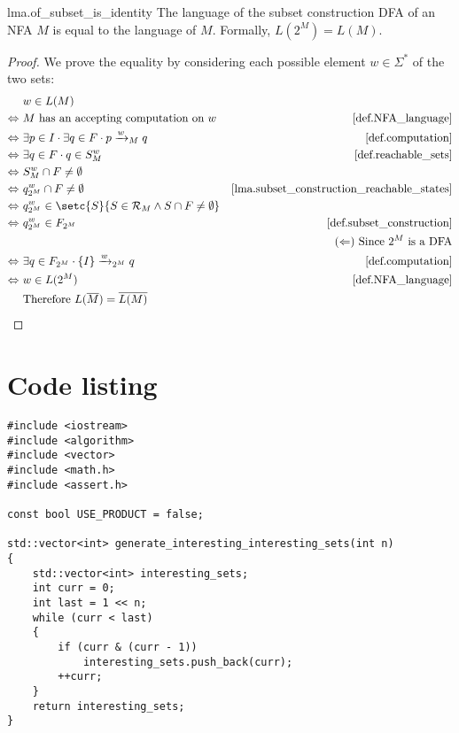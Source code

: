 \documentclass{report}
\DeclarePairedDelimiter{\set}{\{}{\}}
\theoremstyle{definition}
\begin{document}
\begin{appendices}
\begin{replemma}{lma.of_subset_is_identity}
The language of the subset construction DFA of an NFA $M$ is equal to the
language of $M$. Formally, $L(2^M) = L(M)$.
\end{replemma}

\begin{proof}
We prove the equality by considering each possible element $w \in \Sigma^{\ast}$
of the two sets:
\begin{align*}
& w \in L(M) \\
\Leftrightarrow \ & M \text{ has an accepting computation on } w
& \text{\cref{def.NFA_language}} \\
\Leftrightarrow \ & \exists p \in I \cdot \exists q \in F \cdot
p \xrightarrow{w}_M q
& \text{\cref{def.computation}} \\
\Leftrightarrow \ & \exists q \in F \cdot q \in S^w_M
& \text{\cref{def.reachable_sets}} \\
\Leftrightarrow \ & S^w_M \cap F \neq \emptyset \\
\Leftrightarrow \ & q^w_{2^M} \cap F \neq \emptyset
& \text{\cref{lma.subset_construction_reachable_states}} \\
\Leftrightarrow \ & q^w_{2^M} \in \setc{S}{S \in \mathcal{R}_M \wedge S \cap F \neq \emptyset} \\
\Leftrightarrow \ & q^w_{2^M} \in F_{2^M}
& \text{\cref{def.subset_construction}} \\
& & (\Leftarrow) \text{ Since } 2^M \text{ is a DFA} \\
\Leftrightarrow \ & \exists q \in F_{2^M} \cdot \set{I} \xrightarrow{w}_{2^M} q
& \text{\cref{def.computation}} \\
\Leftrightarrow \ & w \in L(2^M)
& \text{\cref{def.NFA_language}} \\
& \text{Therefore } L(\overline{M}) = \overline{L(M)}
\end{align*}
\end{proof}

\chapter{Code listing}
\label{app.code}

\begin{lstlisting}
#include <iostream>
#include <algorithm>
#include <vector>
#include <math.h>
#include <assert.h>

const bool USE_PRODUCT = false;

std::vector<int> generate_interesting_interesting_sets(int n)
{
    std::vector<int> interesting_sets;
    int curr = 0;
    int last = 1 << n;
    while (curr < last)
    {
        if (curr & (curr - 1))
            interesting_sets.push_back(curr);
        ++curr;
    }
    return interesting_sets;
}


\end{lstlisting}
\end{appendices}
\end{document}
